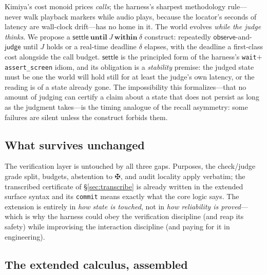 \documentclass[acmsmall,screen,nonacm]{acmart}
\newcommand{\judge}{\mathsf{judge}}
\newcommand{\observe}{\mathsf{observe}}
\newcommand{\settle}{\mathsf{settle}}
\newcommand{\bolt}{\maltese}
\theoremstyle{acmdefinition}%
\theoremstyle{acmplain}%
\begin{document}
Kimiya's cost monoid prices \emph{calls}; the harness's sharpest
methodology rule---never walk playback markers while audio plays, because
the locator's seconds of latency are wall-clock drift---has no home in it.
The world evolves \emph{while the judge thinks}. We propose a
$\settle\ \mathbf{until}\ J\ \mathbf{within}\ \delta$ construct: repeatedly
$\observe$-and-$\judge$ until $J$ holds or a real-time deadline $\delta$
elapses, with the deadline a first-class cost alongside the call budget.
$\settle$ is the principled form of the harness's \texttt{wait}$+$
\texttt{assert\_screen} idiom, and its obligation is a \emph{stability}
premise: the judged state must be one the world will hold still for at
least the judge's own latency, or the reading is of a state already gone.
The impossibility this formalizes---that no amount of judging can
certify a claim about a state that does not persist as long as the
judgment takes---is the timing analogue of the recall asymmetry: some
failures are silent unless the construct forbids them.

\subsection{What survives unchanged}
\label{sec:survives}

The verification layer is untouched by all three gaps. Purposes, the
check/judge grade split, budgets, abstention to $\bolt$, and audit
locality apply verbatim; the transcribed certificate of
\S\ref{sec:transcribe} is already written in the extended surface syntax
and its \texttt{commit} means exactly what the core logic says. The
extension is entirely in \emph{how state is touched}, not in \emph{how
reliability is proved}---which is why the harness could obey the
verification discipline (and reap its safety) while improvising the
interaction discipline (and paying for it in engineering).

\subsection{The extended calculus, assembled}
\label{sec:assembled}
\end{document}
